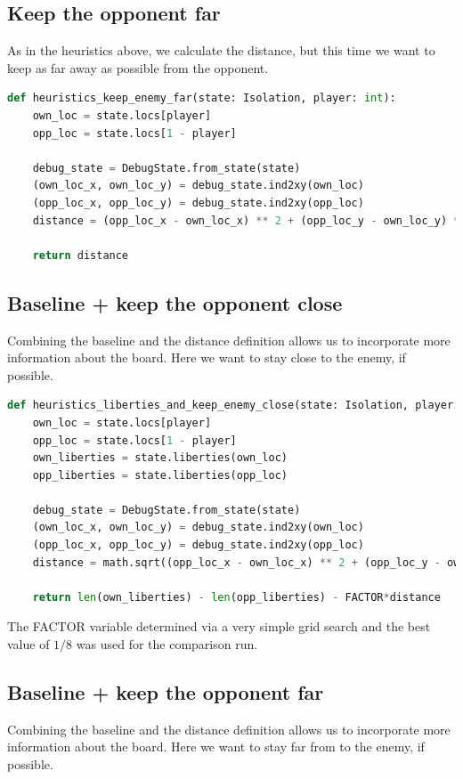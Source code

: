 \documentclass[aps,prd,notitlepage,floatfix,superscriptaddress,groupedaddress,nofootinbib]{revtex4-1}
\begin{document}
\subsection*{Keep the opponent far}
As in the heuristics above, we calculate the distance, but this time we want to keep as far away as possible from the opponent.

\begin{lstlisting}[language=python]
def heuristics_keep_enemy_far(state: Isolation, player: int):
    own_loc = state.locs[player]
    opp_loc = state.locs[1 - player]

    debug_state = DebugState.from_state(state)
    (own_loc_x, own_loc_y) = debug_state.ind2xy(own_loc)
    (opp_loc_x, opp_loc_y) = debug_state.ind2xy(opp_loc)
    distance = (opp_loc_x - own_loc_x) ** 2 + (opp_loc_y - own_loc_y) ** 2

    return distance
\end{lstlisting}

\subsection*{Baseline + keep the opponent close}
Combining the baseline and the distance definition allows us to incorporate more information about the board. Here we want to stay close to the enemy, if possible.

\begin{lstlisting}[language=python]
def heuristics_liberties_and_keep_enemy_close(state: Isolation, player: int):
    own_loc = state.locs[player]
    opp_loc = state.locs[1 - player]
    own_liberties = state.liberties(own_loc)
    opp_liberties = state.liberties(opp_loc)

    debug_state = DebugState.from_state(state)
    (own_loc_x, own_loc_y) = debug_state.ind2xy(own_loc)
    (opp_loc_x, opp_loc_y) = debug_state.ind2xy(opp_loc)
    distance = math.sqrt((opp_loc_x - own_loc_x) ** 2 + (opp_loc_y - own_loc_y) ** 2)

    return len(own_liberties) - len(opp_liberties) - FACTOR*distance
\end{lstlisting}

The FACTOR variable determined via a very simple grid search and the best value of $1/8$ was used for the comparison run.

\subsection*{Baseline + keep the opponent far}
Combining the baseline and the distance definition allows us to incorporate more information about the board. Here we want to stay far from to the enemy, if possible.
\end{document}
